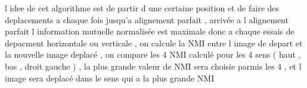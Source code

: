 \documentclass[a4paper,10pt]{scrartcl}
\theoremstyle{plain}
\begin{document}
l idee de cet algorithme est de partir d une certaine position et de faire des deplacements a chaque fois jusqu'a alignement parfait , arrivée a l alignement parfait l information mutuelle normalisée est maximale donc a chaque essais de depacment horizontale ou verticale , on calcule la NMI entre l image de depart et la nouvelle image deplacé , on compare les 4 NMI calculé pour les 4 sens ( haut , bas , droit gauche ) , la plus grande valeur de NMI sera choisie parmis les 4 , et l image sera deplacé dans le sens qui a la plus grande NMI 
\end{document}
